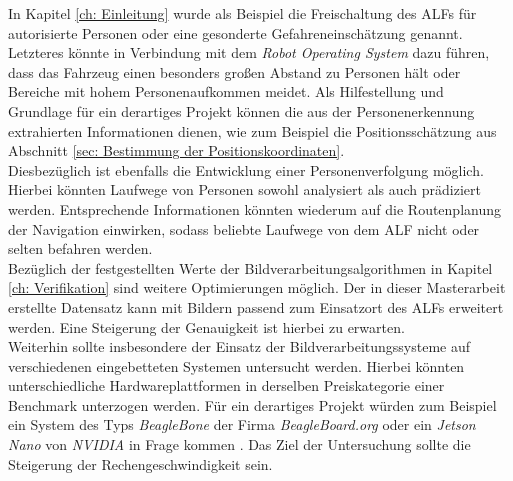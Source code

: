 In Kapitel \ref{ch: Einleitung} wurde als Beispiel die Freischaltung des ALFs für autorisierte Personen oder eine gesonderte Gefahreneinschätzung genannt. Letzteres könnte in Verbindung mit dem \textit{Robot Operating System} dazu führen, dass das Fahrzeug einen besonders großen Abstand zu Personen hält oder Bereiche mit hohem Personenaufkommen meidet. Als Hilfestellung und Grundlage für ein derartiges Projekt können die aus der Personenerkennung extrahierten Informationen dienen, wie zum Beispiel die Positionsschätzung aus Abschnitt \ref{sec: Bestimmung der Positionskoordinaten}. \\

Diesbezüglich ist ebenfalls die Entwicklung einer Personenverfolgung möglich. Hierbei könnten Laufwege von Personen sowohl analysiert als auch prädiziert werden. Entsprechende Informationen könnten wiederum auf die Routenplanung der Navigation einwirken, sodass beliebte Laufwege von dem ALF nicht oder selten befahren werden. \\

Bezüglich der festgestellten Werte der Bildverarbeitungsalgorithmen in Kapitel \ref{ch: Verifikation} sind weitere Optimierungen möglich. Der in dieser Masterarbeit erstellte Datensatz kann mit Bildern passend zum Einsatzort des ALFs erweitert werden. Eine Steigerung der Genauigkeit ist hierbei zu erwarten.\\

Weiterhin sollte insbesondere der Einsatz der Bildverarbeitungssysteme auf verschiedenen eingebetteten Systemen untersucht werden. Hierbei könnten unterschiedliche Hardwareplattformen in derselben Preiskategorie einer Benchmark unterzogen werden. Für ein derartiges Projekt würden zum Beispiel ein System des Typs \textit{BeagleBone} der Firma \textit{BeagleBoard.org} oder ein \textit{Jetson Nano} von \textit{NVIDIA} in Frage kommen \cite{beagle, jetson}. Das Ziel der Untersuchung sollte die Steigerung der Rechengeschwindigkeit sein. 





